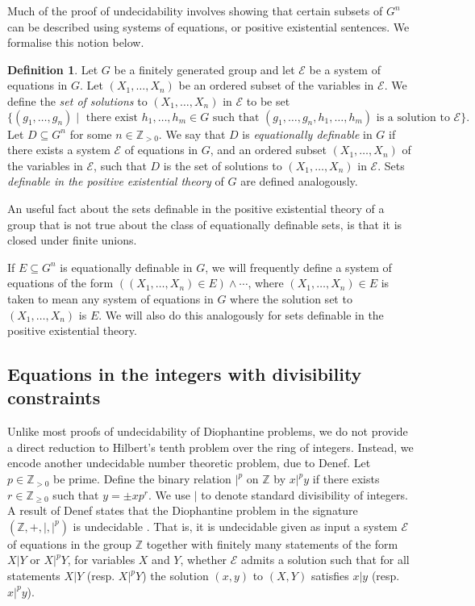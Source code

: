 \documentclass[11pt]{amsart}
\theoremstyle{definition}
\newtheorem{dfn}[theorem]{Definition}
\numberwithin{theorem}{section}
\newcommand{\Z}{\mathbb{Z}}
\begin{document}
	Much of the proof of undecidability involves showing that certain subsets of
	\(G^n\) can be described using systems of equations, or positive
	existential sentences. We formalise this notion below.
    \begin{dfn}
		Let \(G\) be a finitely generated group and let \(\mathcal E\) be a system
		of equations in \(G\). Let \((X_1, \ldots, X_n)\) be 
		an ordered subset of the variables in
		\(\mathcal E\). We define the \emph{set of solutions} to
        \((X_1, \ldots, X_n)\) in \(\mathcal E\) to be set
        \[
        \{(g_1, \ldots, g_n) \mid \textrm{ there exist } h_1, \ldots, h_m
                \in G \textrm{ such that } (g_1, \ldots, g_n, h_1, \ldots, h_m)
		\text{ is a solution to } \mathcal E\}.
		\]
		Let \(D \subseteq G^n\) for some \(n \in \Z_{> 0}\). We say that \(D\) is
		\emph{equationally definable} in \(G\) if there exists a system
		\(\mathcal E\) of equations in \(G\), and an ordered subset \((X_1,
		\ldots, X_n)\) of the variables in \(\mathcal E\), such that \(D\) is
		the set of solutions to \((X_1, \ldots, X_n)\) in \(\mathcal E\). Sets
		\emph{definable in the positive existential theory} of \(G\) are
		defined analogously.
	\end{dfn}

	An useful fact about the sets definable in the positive existential
	theory of a group that is not true about the class of equationally
	definable sets, is that it is closed under finite unions.

	If \(E \subseteq G^n\) is equationally definable in \(G\), we will
	frequently define a system of equations of the form \(((X_1, \ldots, X_n)
	\in E) \wedge \cdots\), where \((X_1, \ldots, X_n) \in E\) is taken to mean
	any system of equations in \(G\) where the solution set to \((X_1, \ldots,
	X_n)\) is \(E\). We will also do this analogously for sets definable in the
	positive existential theory.

\subsection{Equations in the integers with divisibility constraints}
Unlike most proofs of undecidability of Diophantine problems, we do not
provide a direct reduction to Hilbert's tenth problem over the ring of integers.
Instead, we encode another undecidable number theoretic problem, due to Denef.
Let \(p \in \Z_{> 0}\) be prime. Define the binary relation \(|^p\) on
\(\Z\) by \(x |^p y\) if there exists \(r \in \Z_{\geq 0}\) such that
\(y = \pm x p^r\). We use \(|\) to denote standard divisibility of integers. A result
of Denef states that the Diophantine problem in the signature \((\Z, +, |, |^p)\)
is undecidable \cite[Corollary on page 132]{Denef}. That is, it is undecidable given as input a system \(\mathcal E\) of equations in the
group \(\Z\) together with finitely many statements of the form \(X|Y\) or \(X|^p Y\),
for variables \(X\) and \(Y\),
whether \(\mathcal E\) admits a solution such that for all statements \(X|Y\) (resp.
\(X|^p Y\)) the solution \((x, y)\) to \((X, Y)\) satisfies \(x | y\) (resp. \(x |^p y\)).
\end{document}
